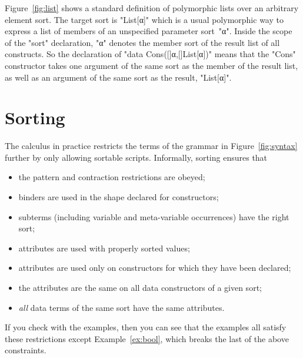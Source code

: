 \documentclass[letterpaper,11pt]{article}
\begin{document}
\begin{example}[lists]\label{ex:list}
  Figure~\ref{fig:list} shows a standard definition of polymorphic lists over an arbitrary element
  sort.  The target sort is "List[α]" which is a usual polymorphic way to express a list of members
  of an unspecified parameter sort~"α".  Inside the scope of the "sort" declaration, "α" denotes the
  member sort of the result list of all constructs. So the declaration of "data Cons([]α,[]List[α])"
  means that the "Cons" constructor takes one argument of the same sort as the member of the result
  list, as well as an argument of the same sort as the result, "List[α]".

\end{example}



\begin{example}[maps]
  
\end{example}



\section{Sorting}
\label{sec:sorting}

The \hax calculus in practice restricts the terms of the grammar in Figure~\ref{fig:syntax} further
by only allowing sortable scripts. Informally, sorting ensures that
\begin{itemize}
\item the pattern and contraction restrictions are obeyed;
\item binders are used in the shape declared for constructors;
\item subterms (including variable and meta-variable occurrences) have the right sort;
\item attributes are used with properly sorted values;
\item attributes are used only on constructors for which they have been declared;
\item the attributes are the same on all data constructors of a given sort;
\item \emph{all} data terms of the same sort have the same attributes.
\end{itemize}
If you check with the examples, then you can see that the examples all satisfy these restrictions
except Example~\ref{ex:bool}, which breaks the last of the above constraints. 
\end{document}
